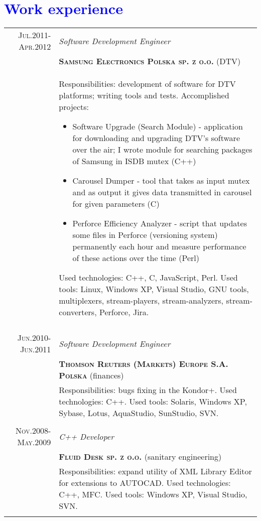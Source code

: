 \documentclass[a4paper,12pt]{article}
\begin{document}
\section{\textcolor{Blue}{Work experience}}
\begin{tabular}{r|p{12cm}}
	\textsc{Jul.2011-Apr.2012}
	&\emph{Software Development Engineer}\\
	&\textsc{\textbf{Samsung Electronics Polska sp. z o.o.}} (DTV)\\
	&\footnotesize{
		Responsibilities: development of software for DTV platforms; writing tools and tests.\newline
		Accomplished projects:
			\begin{itemize}
				\item Software Upgrade (Search Module) - application for downloading and upgrading DTV's software over the air; I wrote module for
				searching packages of Samsung in ISDB mutex (C++)
				\item Carousel Dumper - tool that takes as input mutex and as output it gives data transmitted in carousel for given parameters (C)
				\item Perforce Efficiency Analyzer - script that updates some files in Perforce (versioning system) permanently each hour and measure
				performance of these actions over the time (Perl)
			\end{itemize}
		Used technologies: C++, C, JavaScript, Perl. Used tools: Linux, Windows XP, Visual Studio, GNU tools, multiplexers,
		stream-players, stream-analyzers, stream-converters, Perforce, Jira.
	}\\
	\multicolumn{2}{c}{}\\

	\textsc{Jun.2010-Jun.2011}
	&\emph{Software Development Engineer}\\
	&\textsc{\textbf{Thomson Reuters (Markets) Europe S.A. Polska}} (finances)\\
	&\footnotesize{ Responsibilities: bugs fixing in the Kondor+. Used technologies: C++.
		Used tools: Solaris, Windows XP, Sybase, Lotus, AquaStudio, SunStudio, SVN.}\\
	\multicolumn{2}{c}{}\\

	\textsc{Nov.2008-May.2009}
	&\emph{C++ Developer}\\
	&\textsc{\textbf{Fluid Desk sp. z o.o.}} (sanitary engineering)\\
	&\footnotesize{Responsibilities: expand utility of XML Library Editor for extensions
		to AUTOCAD. Used technologies: C++, MFC. Used tools: Windows XP, Visual Studio, SVN.}\\
	\multicolumn{2}{c}{}\\
\end{tabular}
\end{document}
